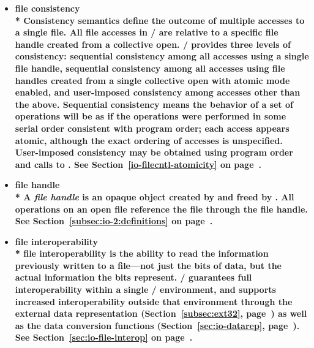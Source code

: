 \begin{itemize}
\label{glossary:file_consistency}
\item \bf{ file consistency} \\*
Consistency semantics define the outcome of multiple accesses
to a single file.
All file accesses in \MPI/ are relative to a specific file handle
created from a collective open.
\MPI/ provides three levels of consistency:
sequential consistency among all accesses using a single file handle,
sequential consistency among all accesses
using file handles created from a single collective open
with atomic mode enabled,
and
user-imposed consistency among accesses other than the above.
Sequential consistency means the behavior of a set of operations
will be as if the operations were performed in some serial order
consistent with program order; each access appears atomic,
although the exact ordering of accesses is unspecified.
User-imposed consistency may be obtained using program order
and calls to .
See Section~\ref{io-filecntl-atomicity} on page~\pageref{io-filecntl-atomicity}.

\label{glossary:file_handle}
\item \bf{ file handle} \\* 
A {\it file handle} is an opaque object created by 
and freed by .
All operations on an open file
reference the file through the file handle.
See Section~\ref{subsec:io-2:definitions} on page~\pageref{subsec:io-2:definitions}.

\label{glossary:file_interoperability}
\item \bf{ file interoperability} \\* 
file interoperability is the ability to
read the information previously written to a file---not just the
bits of data, but the actual information the bits represent.
\MPI/ guarantees full interoperability within a single \MPI/ environment,
and supports increased interoperability outside that environment
through the external data representation (Section~\ref{subsec:ext32}, page~\pageref{subsec:ext32}) as
well as the data conversion functions (Section~\ref{sec:io-datarep},
page~\pageref{sec:io-datarep}). 
See Section~\ref{sec:io-file-interop} on page~\pageref{sec:io-file-interop}.


\end{itemize}
